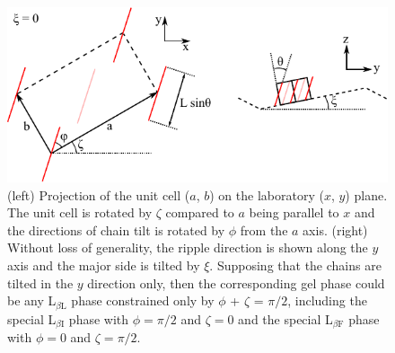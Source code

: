 \begin{figure}[htbp]
  \centering
  \includegraphics[width=\textwidth]{figures/ripple/thin_rod_model/unit_cell_combined}
  \caption[Thin rod model]{
  (left) Projection of the unit cell ($a$, $b$) on the laboratory ($x$, $y$) plane.  
  The unit cell is rotated by $\zeta$ compared to $a$ being parallel to $x$ and the 
  directions of chain tilt is rotated by $\phi$ from the $a$ axis. 
  (right) Without loss of generality, the ripple direction is shown along 
  the $y$ axis and the major side is tilted by $\xi$.  Supposing that the chains 
  are tilted in the $y$ direction only, then the corresponding gel phase could 
  be any L$_{\beta\text{L}}$ phase constrained only by 
  $\phi$ + $\zeta$ = $\pi/2$, including the 
  special L$_{\beta\text{I}}$ phase with $\phi=\pi/2$ and $\zeta=0$ and the 
  special L$_{\beta\text{F}}$ phase with $\phi=0$ and $\zeta=\pi/2$.}
  \label{fig:thin_rod_model}
\end{figure}

